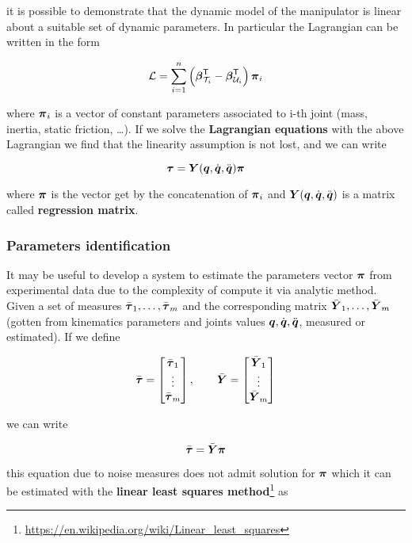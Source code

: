 it is possible to demonstrate that the  dynamic model of the manipulator is linear about a suitable set of dynamic parameters.
In particular the Lagrangian can be written in the form

\[
	\mathcal{L} = \sum_{i=1}^n \left( \boldsymbol{\beta}_{\mathcal{T}_i}^{\mathsf{T}} - \boldsymbol{\beta}_{\mathcal{U}_i}^{\mathsf{T}} \right) \boldsymbol{\pi}_i
\]

where $\boldsymbol{\pi}_i$ is a vector of constant parameters associated to i-th joint (mass, inertia, static friction, \dots).
If we solve the \textbf{Lagrangian equations} with the above Lagrangian we find that the linearity assumption is not lost, and we can write

\[
	\boldsymbol{\tau} = \boldsymbol{Y}(\boldsymbol{q},\dot{\boldsymbol{q}},\ddot{\boldsymbol{q}})\boldsymbol{\pi}
\]

where $\boldsymbol{\pi}$ is the vector get by the concatenation of $\boldsymbol{\pi}_i$ and $\boldsymbol{Y}(\boldsymbol{q},\dot{\boldsymbol{q}},\ddot{\boldsymbol{q}})$ is a matrix called \textbf{regression matrix}.

\subsubsection{Parameters identification}

It may be useful to develop a system to estimate the parameters vector $\boldsymbol{\pi}$ from experimental data due to the complexity of compute it via analytic method.
Given a set of measures $\bar{\boldsymbol{\tau}}_1,\dots,\bar{\boldsymbol{\tau}}_m$ and the corresponding matrix $\bar{\boldsymbol{Y}}_1,\dots,\bar{\boldsymbol{Y}}_m$ (gotten from kinematics parameters and joints values $\boldsymbol{q},\dot{\boldsymbol{q}},\ddot{\boldsymbol{q}}$, measured or estimated).
If we define

\[
	\bar{\boldsymbol{\tau}} = \begin{bmatrix} \bar{\boldsymbol{\tau}}_1 \\ \vdots \\ \bar{\boldsymbol{\tau}}_m \end{bmatrix}, \qquad
	\bar{\boldsymbol{Y}} = \begin{bmatrix} \bar{\boldsymbol{Y}}_1 \\ \vdots \\ \bar{\boldsymbol{Y}}_m \end{bmatrix}
\]

we can write

\[
	\bar{\boldsymbol{\tau}} = \bar{\boldsymbol{Y}} \boldsymbol{\pi}
\]

this equation due to noise measures does not admit solution for $\boldsymbol{\pi}$ which it can be estimated with the \textbf{linear least squares method}\footnote{\url{https://en.wikipedia.org/wiki/Linear_least_squares}} as

